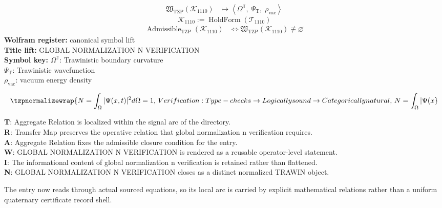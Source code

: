 \noindent
\begin{minipage}[t]{0.48\linewidth}
\begingroup
\small
\[
\begin{aligned}
\mathfrak{W}_{\mathrm{TZP}}\!\left(\mathcal{K}_{1110}\right)
&\longmapsto
\left\langle \Omega^{\mathbb{T}},\; \Psi_{\mathrm{T}},\; \rho_{\mathrm{vac}} \right\rangle
\end{aligned}
\]
\[
\mathcal{K}_{1110}
:=
\operatorname{HoldForm}\!\left(\mathcal{T}_{1110}\right)
\]
\[
\begin{aligned}
\operatorname{Admissible}_{\mathrm{TZP}}\!\left(\mathcal{K}_{1110}\right)
&\Longleftrightarrow
\mathfrak{W}_{\mathrm{TZP}}\!\left(\mathcal{K}_{1110}\right)\not\equiv\varnothing
\end{aligned}
\]
\textbf{Wolfram register:} canonical symbol lift\\
\textbf{Title lift:} GLOBAL NORMALIZATION N VERIFICATION\\
\textbf{Symbol key:} \(\Omega^{\mathbb{T}}\): Trawinistic boundary curvature\\ \(\Psi_{\mathrm{T}}\): Trawinistic wavefunction\\ \(\rho_{\mathrm{vac}}\): vacuum energy density
\par
\endgroup
\end{minipage}\hfill
\begin{minipage}[t]{0.48\linewidth}
\[
\tzpnormalizewrap{N = \int_\Omega |\Psi(x, t)|^2 d\Omega = 1,\,Verification: Type-checks \to Logically sound \to Categorically natural,\,N = \int_\Omega |\Psi(x}
\]

\small
\textbf{T}: Aggregate Relation is localized within the signal arc of the directory.\\
\textbf{R}: Transfer Map preserves the operative relation that global normalization n verification requires.\\
\textbf{A}: Aggregate Relation fixes the admissible closure condition for the entry.\\
\textbf{W}: GLOBAL NORMALIZATION N VERIFICATION is rendered as a reusable operator-level statement.\\
\textbf{I}: The informational content of global normalization n verification is retained rather than flattened.\\
\textbf{N}: GLOBAL NORMALIZATION N VERIFICATION closes as a distinct normalized TRAWIN object.
\normalsize
\end{minipage}

The entry now reads through actual sourced equations, so its local arc is carried by explicit mathematical relations rather than a uniform quaternary certificate record shell.
\clearpage

